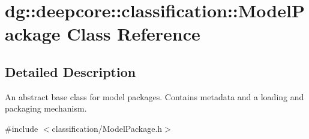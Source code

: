 \hypertarget{classdg_1_1deepcore_1_1classification_1_1_model_package}{}\section{dg\+:\+:deepcore\+:\+:classification\+:\+:Model\+Package Class Reference}
\label{classdg_1_1deepcore_1_1classification_1_1_model_package}


\subsection{Detailed Description}
An abstract base class for model packages. Contains metadata and a loading and packaging mechanism. 

{\ttfamily \#include $<$classification/\+Model\+Package.\+h$>$}

